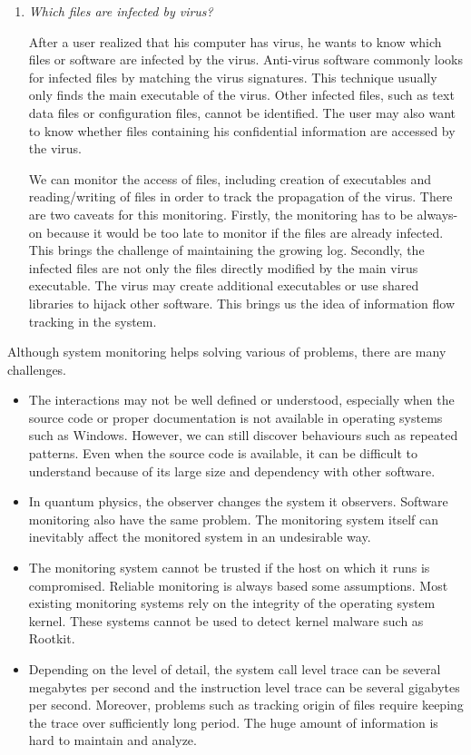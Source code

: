 \begin{enumerate}
\item {\em Which files are infected by virus?}

After a user realized that his computer has virus, he wants to know
which files or software are infected by the virus.
Anti-virus software commonly looks for infected files by matching the
virus signatures.
This technique usually only finds the main executable of the virus.
Other infected files, such as text data files or configuration files,
cannot be identified.
The user may also want to know whether files containing his confidential
information are accessed by the virus.

We can monitor the access of files, including creation of executables
and reading/writing of files in order to track the propagation of the virus.
There are two caveats for this monitoring.
Firstly, the monitoring has to be always-on because it would be
too late to monitor if the files are already infected.
This brings the challenge of maintaining the growing log.
Secondly, the infected files are not only the files directly modified by
the main virus executable.
The virus may create additional executables or use shared libraries to
hijack other software.
This brings us the idea of information flow tracking in the system.
\end{enumerate}

Although system monitoring helps solving various of problems,
there are many challenges.

\begin{itemize}
\item
The interactions may not be well defined or understood,
especially when the source code or proper documentation is not available
in operating systems such as Windows.
However, we can still discover behaviours such as repeated patterns.
Even when the source code is available, it can be difficult to understand
because of its large size and dependency with other software.
\item
In quantum physics, the observer changes the system it observers.
Software monitoring also have the same problem.
The monitoring system itself can inevitably affect the monitored system
in an undesirable way.
\item
The monitoring system cannot be trusted if the host on which it
runs is compromised.
Reliable monitoring is always based some assumptions.
Most existing monitoring systems rely on the integrity of
the operating system kernel.
These systems cannot be used to detect kernel malware such as Rootkit.
\item
Depending on the level of detail, the system call level trace can be
several megabytes per second and the instruction level trace can be
several gigabytes per second.
Moreover, problems such as tracking origin of files require keeping the trace
over sufficiently long period.
The huge amount of information is hard to maintain and
analyze.
\end{itemize}

